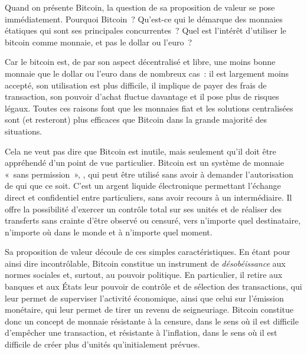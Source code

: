 Quand on présente Bitcoin, la question de sa proposition de valeur se pose immédiatement. Pourquoi Bitcoin~? Qu'est-ce qui le démarque des monnaies étatiques qui sont ses principales concurrentes~? Quel est l'intérêt d'utiliser le bitcoin comme monnaie, et pas le dollar ou l'euro~?

Car le bitcoin est, de par son aspect décentralisé et libre, une moins bonne monnaie que le dollar ou l'euro dans de nombreux cas~: il est largement moins accepté, son utilisation est plus difficile, il implique de payer des frais de transaction, son pouvoir d'achat fluctue davantage et il pose plus de risques légaux. Toutes ces raisons font que les monnaies fiat et les solutions centralisées sont (et resteront) plus efficaces que Bitcoin dans la grande majorité des situations.

Cela ne veut pas dire que Bitcoin est inutile, mais seulement qu'il doit être appréhendé d'un point de vue particulier. Bitcoin est un système de monnaie «~sans permission~», , qui peut être utilisé sans avoir à demander l'autorisation de qui que ce soit. C'est un argent liquide électronique permettant l'échange direct et confidentiel entre particuliers, sans avoir recours à un intermédiaire. Il offre la possibilité d'exercer un contrôle total sur ses unités et de réaliser des transferts sans crainte d'être observé ou censuré, vers n'importe quel destinataire, n'importe où dans le monde et à n'importe quel moment.

Sa proposition de valeur découle de ces simples caractéristiques. En étant pour ainsi dire incontrôlable, Bitcoin constitue un instrument de \emph{désobéissance} aux normes sociales et, surtout, au pouvoir politique. En particulier, il retire aux banques et aux États leur pouvoir de contrôle et de sélection des transactions, qui leur permet de superviser l'activité économique, ainsi que celui sur l'émission monétaire, qui leur permet de tirer un revenu de seigneuriage. Bitcoin constitue donc un concept de monnaie résistante à la censure, dans le sens où il est difficile d'empêcher une transaction, et résistante à l'inflation, dans le sens où il est difficile de créer plus d'unités qu'initialement prévues.


